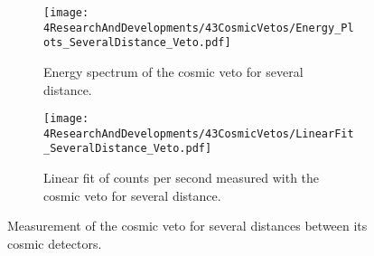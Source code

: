 



\begin{figure}
\centering
    \begin{subfigure}[b]{0.85\textwidth}
    \centering
    \texttt{[image: 4ResearchAndDevelopments/43CosmicVetos/Energy\_Plots\_SeveralDistance\_Veto.pdf]}  
    \caption{Energy spectrum of the cosmic veto for several distance.\label{subfig:EnergySpectrumsSeveralDistanceVeto}}
    \end{subfigure}
    \hfill
    \begin{subfigure}[b]{0.85\textwidth}
    \centering
    \texttt{[image: 4ResearchAndDevelopments/43CosmicVetos/LinearFit\_SeveralDistance\_Veto.pdf]}  
    \caption{Linear fit of counts per second measured with the cosmic veto for several distance.\label{subfig:LinearFitSeveralDistanceVeto}}
    \end{subfigure}
 \caption{Measurement of the cosmic veto for several distances between its cosmic detectors.}
 \label{fig:DistanceVeto}
\end{figure}

